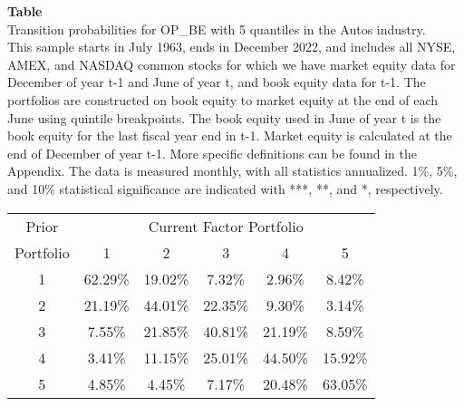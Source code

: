 \begin{table*}[ht!]
\raggedright
{}
\label{tab: transition_probs_OP_BE_Autos_with_5_quantiles}
\textbf{Table \thetable} \\
Transition probabilities for OP_BE with 5 quantiles in the Autos industry. \\
\hspace*{1em}This sample starts in July 1963, ends in December 2022, and includes all NYSE, AMEX, and NASDAQ common stocks for which we have market equity data for December of year t-1 and June of year t, and book equity data for t-1. The portfolios are constructed on book equity to market equity at the end of each June using quintile breakpoints.  The book equity used in June of year t is the book equity for the last fiscal year end in t-1.  Market equity is calculated at the end of December of year t-1.  More specific definitions can be found in the Appendix.  The data is measured monthly, with all statistics annualized.  1\%, 5\%, and 10\% statistical significance are indicated with ***, **, and *, respectively. \\
\vspace{0.5em}
\centering
\begin{adjustbox}{max width=\textwidth}
\begin{tabular}{@{}cccccc@{}}
\toprule
Prior & \multicolumn{5}{c}{Current Factor Portfolio} \\
Portfolio & 1 & 2 & 3 & 4 & 5 \\
\midrule
1 & 62.29\% & 19.02\% & 7.32\% & 2.96\% & 8.42\% \\
2 & 21.19\% & 44.01\% & 22.35\% & 9.30\% & 3.14\% \\
3 & 7.55\% & 21.85\% & 40.81\% & 21.19\% & 8.59\% \\
4 & 3.41\% & 11.15\% & 25.01\% & 44.50\% & 15.92\% \\
5 & 4.85\% & 4.45\% & 7.17\% & 20.48\% & 63.05\% \\
\bottomrule
\end{tabular}
\end{adjustbox}
\end{table*}